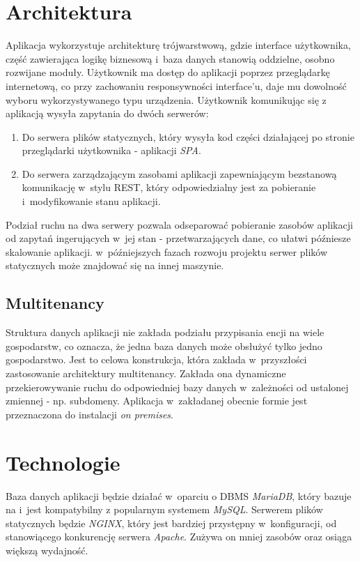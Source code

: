 

\newpage

\section{Architektura}
Aplikacja wykorzystuje architekturę trójwarstwową, gdzie interface użytkownika, część zawierająca logikę biznesową i~baza danych stanowią oddzielne, osobno rozwijane moduły. Użytkownik ma dostęp do aplikacji poprzez przeglądarkę internetową, co przy zachowaniu responsywności interface'u, daje mu dowolność wyboru wykorzystywanego typu urządzenia. Użytkownik komunikując się z aplikacją wysyła zapytania do dwóch serwerów:
\begin{enumerate}
  \item Do serwera plików statycznych, który wysyła kod części działającej po stronie przeglądarki użytkownika - aplikacji \textit{SPA}.
  \item Do serwera zarządzającym zasobami aplikacji zapewniającym bezstanową komunikację w~stylu REST, który odpowiedzialny jest za pobieranie i~modyfikowanie stanu aplikacji.
\end{enumerate}
Podział ruchu na dwa serwery pozwala odseparować pobieranie zasobów aplikacji od zapytań ingerujących w~jej stan - przetwarzających dane, co ułatwi późniesze skalowanie aplikacji. w~późniejszych fazach rozwoju projektu serwer plików statycznych może znajdować się na innej maszynie.

\subsection{Multitenancy}
Struktura danych aplikacji nie zakłada podziału przypisania encji na wiele gospodarstw, co oznacza, że jedna baza danych może obsłużyć tylko jedno gospodarstwo. Jest to celowa konstrukcja, która zakłada w~przyszłości zastosowanie architektury multitenancy. Zakłada ona dynamiczne przekierowywanie ruchu do odpowiedniej bazy danych w~zależności od ustalonej zmiennej - np. subdomeny. Aplikacja w~zakładanej obecnie formie jest przeznaczona do instalacji \textit{on premises}.

\section{Technologie}
Baza danych aplikacji będzie działać w~oparciu o DBMS \textit{MariaDB}\cite{mariadb}, który bazuje na i~jest kompatybilny z popularnym systemem \textit{MySQL}. Serwerem plików statycznych będzie \textit{NGINX}\cite{nginx}, który jest bardziej przystępny w~konfiguracji, od stanowiącego konkurencję serwera \textit{Apache}\cite{Apache}. Zużywa on mniej zasobów oraz osiąga większą wydajność. 

